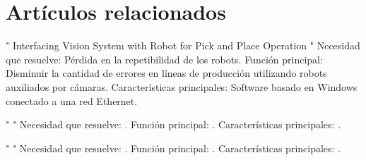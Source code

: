 \section{Art\'iculos relacionados}
\label{Articulos_relacionados}

" Interfacing Vision System with Robot for Pick and Place Operation " \newline
Necesidad que resuelve: P\'erdida en la repetibilidad de los robots.\newline
Funci\'on principal: Disminuir la cantidad de errores en l\'ineas de producci\'on utilizando robots auxiliados por c\'amaras.\newline
Caracter\'isticas principales: Software basado en Windows conectado a una red Ethernet.\par

"  " \newline
Necesidad que resuelve: .\newline
Funci\'on principal: .\newline
Caracter\'isticas principales: .\par

"  " \newline
Necesidad que resuelve: .\newline
Funci\'on principal: .\newline
Caracter\'isticas principales: .\par